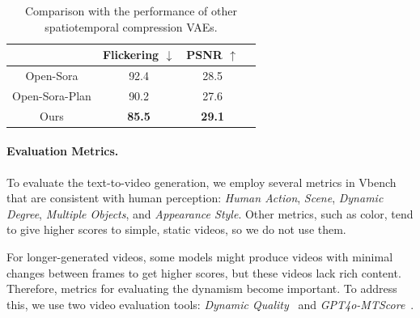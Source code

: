 \begin{table}
  \vspace{-3mm}
  \centering
  \caption{Comparison with the performance of other spatiotemporal compression VAEs.}
  \begin{tabular}{cccc}
    \toprule
     & Flickering $\downarrow$ & PSNR $\uparrow$ \\ \midrule
    Open-Sora & 92.4 & 28.5 \\
    Open-Sora-Plan & 90.2 & 27.6 \\
    Ours & \textbf{85.5} & \textbf{29.1} \\ \bottomrule
  \end{tabular}
  \label{tab:vae2}
  \vspace{-3mm}
\end{table}



\paragraph{Evaluation Metrics.} 
To evaluate the text-to-video generation, we employ several metrics in Vbench~\citep{huang2023vbench} that are consistent with human perception: \emph{Human Action}, \emph{Scene}, \emph{Dynamic Degree}, \emph{Multiple Objects}, and \emph{Appearance Style}. Other metrics, such as color, tend to give higher scores to simple, static videos, so we do not use them.

For longer-generated videos, some models might produce videos with minimal changes between frames to get higher scores, but these videos lack rich content. 
Therefore, metrics for evaluating the dynamism become important. 
To address this, we use two video evaluation tools:  \emph{Dynamic Quality}~\citep{liao2024evaluationtexttovideogenerationmodels} and \emph{GPT4o-MTScore}~\citep{yuan2024chronomagic}.

